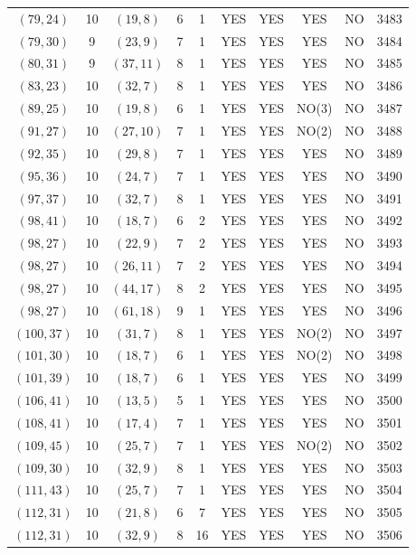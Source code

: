 \begin{longtable}{|c|c|c|c|c|c|c|c|c|c|}
$(79, 24)$ & 10 & $(19, 8)$ & 6 & 1 & YES & YES & YES & NO & 3483\\
$(79, 30)$ & 9 & $(23, 9)$ & 7 & 1 & YES & YES & YES & NO & 3484\\
$(80, 31)$ & 9 & $(37, 11)$ & 8 & 1 & YES & YES & YES & NO & 3485\\
$(83, 23)$ & 10 & $(32, 7)$ & 8 & 1 & YES & YES & YES & NO & 3486\\
$(89, 25)$ & 10 & $(19, 8)$ & 6 & 1 & YES & YES & NO(3) & NO & 3487\\
$(91, 27)$ & 10 & $(27, 10)$ & 7 & 1 & YES & YES & NO(2) & NO & 3488\\
$(92, 35)$ & 10 & $(29, 8)$ & 7 & 1 & YES & YES & YES & NO & 3489\\
$(95, 36)$ & 10 & $(24, 7)$ & 7 & 1 & YES & YES & YES & NO & 3490\\
$(97, 37)$ & 10 & $(32, 7)$ & 8 & 1 & YES & YES & YES & NO & 3491\\
$(98, 41)$ & 10 & $(18, 7)$ & 6 & 2 & YES & YES & YES & NO & 3492\\
$(98, 27)$ & 10 & $(22, 9)$ & 7 & 2 & YES & YES & YES & NO & 3493\\
$(98, 27)$ & 10 & $(26, 11)$ & 7 & 2 & YES & YES & YES & NO & 3494\\
$(98, 27)$ & 10 & $(44, 17)$ & 8 & 2 & YES & YES & YES & NO & 3495\\
$(98, 27)$ & 10 & $(61, 18)$ & 9 & 1 & YES & YES & YES & NO & 3496\\
$(100, 37)$ & 10 & $(31, 7)$ & 8 & 1 & YES & YES & NO(2) & NO & 3497\\
$(101, 30)$ & 10 & $(18, 7)$ & 6 & 1 & YES & YES & NO(2) & NO & 3498\\
$(101, 39)$ & 10 & $(18, 7)$ & 6 & 1 & YES & YES & YES & NO & 3499\\
$(106, 41)$ & 10 & $(13, 5)$ & 5 & 1 & YES & YES & YES & NO & 3500\\
$(108, 41)$ & 10 & $(17, 4)$ & 7 & 1 & YES & YES & YES & NO & 3501\\
$(109, 45)$ & 10 & $(25, 7)$ & 7 & 1 & YES & YES & NO(2) & NO & 3502\\
$(109, 30)$ & 10 & $(32, 9)$ & 8 & 1 & YES & YES & YES & NO & 3503\\
$(111, 43)$ & 10 & $(25, 7)$ & 7 & 1 & YES & YES & YES & NO & 3504\\
$(112, 31)$ & 10 & $(21, 8)$ & 6 & 7 & YES & YES & YES & NO & 3505\\
$(112, 31)$ & 10 & $(32, 9)$ & 8 & 16 & YES & YES & YES & NO & 3506\\

\end{longtable}
